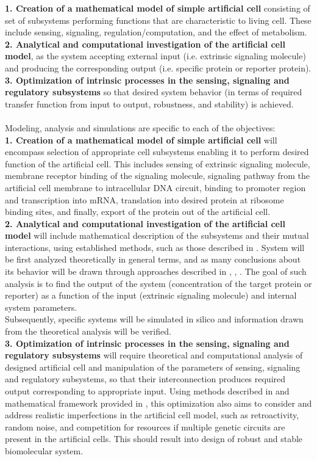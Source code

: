 \documentclass{article}
\begin{document}
\textbf{1. Creation of a mathematical model of simple artificial cell} consisting of set of subsystems performing functions that are characteristic to living cell. These include sensing, signaling, regulation/computation, and the effect of metabolism.\\
\textbf{2. Analytical and computational investigation of the artificial cell model}, as the system accepting external input (i.e. extrinsic signaling molecule) and producing the corresponding output (i.e. specific protein or reporter protein).\\
\textbf{3. Optimization of intrinsic processes in the sensing, signaling and regulatory subsystems} so that desired system behavior (in terms of required transfer function from input to output, robustness, and stability) is achieved.\\ \\
Modeling, analysis and simulations are specific to each of the objectives: \\
\textbf{1. Creation of a mathematical model of simple artificial cell} will encompass selection of appropriate cell subsystems enabling it to perform desired function of the artificial cell. This includes sensing of extrinsic signaling molecule, membrane receptor binding of the signaling molecule, signaling pathway from the artificial cell membrane to intracellular DNA circuit, binding to promoter region and transcription into mRNA, translation into desired protein at ribosome binding sites, and finally, export of the protein out of the artificial cell.\\
\textbf{2. Analytical and computational investigation of the artificial cell model} will include mathematical description of the subsystems and their mutual interactions, using established methods, such as those described in \cite{biofeedback}. System will be first analyzed theoretically in general terms, and as many conclusions about its behavior will be drawn through approaches described in \cite{biofeedback}, \cite{strogatz}, \cite{slotine}. The goal of such analysis is to find the output of the system (concentration of the target protein or reporter) as a function of the input (extrinsic signaling molecule) and internal system parameters. \\
Subsequently, specific systems will be simulated in silico and information drawn from the theoretical analysis will be verified.\\
\textbf{3. Optimization of intrinsic processes in the sensing, signaling and regulatory subsystems} will require theoretical and computational analysis of designed artificial cell and manipulation of the parameters of sensing, signaling and regulatory subsystems, so that their interconnection produces required output corresponding to appropriate input. Using methods described in \cite{biofeedback} and mathematical framework provided in \cite{artificial}, this optimization also aims to consider and address realistic imperfections in the artificial cell model, such as retroactivity, random noise, and competition for resources if multiple genetic circuits are present in the artificial cells. This should result into design of robust and stable biomolecular system.
\end{document}
